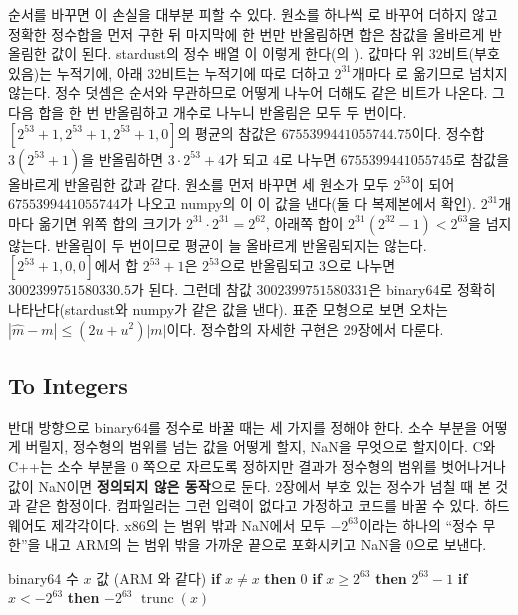 순서를 바꾸면 이 손실을 대부분 피할 수 있다. 원소를 하나씩 로 바꾸어 더하지 않고 정확한 정수합을 먼저 구한 뒤 마지막에 한 번만 반올림하면 합은 참값을 올바르게 반올림한 값이 된다. stardust의 정수 배열 이 이렇게 한다(의 ). 값마다 위 $32$비트(부호 있음)는  누적기에, 아래 $32$비트는  누적기에 따로 더하고 $2^{31}$개마다 로 옮기므로 넘치지 않는다. 정수 덧셈은 순서와 무관하므로 어떻게 나누어 더해도 같은 비트가 나온다. 그다음 합을 한 번 반올림하고 개수로 나누니 반올림은 모두 두 번이다. $[2^{53}+1,2^{53}+1,2^{53}+1,0]$의 평균의 참값은 $6755399441055744.75$이다. 정수합 $3(2^{53}+1)$을 반올림하면 $3\cdot2^{53}+4$가 되고 $4$로 나누면 $6755399441055745$로 참값을 올바르게 반올림한 값과 같다. 원소를 먼저 바꾸면 세 원소가 모두 $2^{53}$이 되어 $6755399441055744$가 나오고 numpy의 이 이 값을 낸다(둘 다 복제본에서 확인). $2^{31}$개마다 옮기면 위쪽 합의 크기가 $2^{31}\cdot2^{31}=2^{62}$, 아래쪽 합이 $2^{31}(2^{32}-1)<2^{63}$을 넘지 않는다. 반올림이 두 번이므로 평균이 늘 올바르게 반올림되지는 않는다. $[2^{53}+1,0,0]$에서 합 $2^{53}+1$은 $2^{53}$으로 반올림되고 $3$으로 나누면 $3002399751580330.5$가 된다. 그런데 참값 $3002399751580331$은 binary64로 정확히 나타난다(stardust와 numpy가 같은 값을 낸다). 표준 모형으로 보면 오차는 $|\hat m-m|\le(2u+u^2)|m|$이다. 정수합의 자세한 구현은 29장에서 다룬다.

\subsection{To Integers}

반대 방향으로 binary64를 정수로 바꿀 때는 세 가지를 정해야 한다. 소수 부분을 어떻게 버릴지, 정수형의 범위를 넘는 값을 어떻게 할지, NaN을 무엇으로 할지이다. C와 C++는 소수 부분을 $0$ 쪽으로 자르도록 정하지만 결과가 정수형의 범위를 벗어나거나 값이 NaN이면 \textbf{정의되지 않은 동작}으로 둔다\cite{iso14882-2020}. 2장에서 부호 있는 정수가 넘칠 때 본 것과 같은 함정이다. 컴파일러는 그런 입력이 없다고 가정하고 코드를 바꿀 수 있다. 하드웨어도 제각각이다. x86의 는 범위 밖과 NaN에서 모두 $-2^{63}$이라는 하나의 ``정수 무한''을 내고 ARM의 는 범위 밖을 가까운 끝으로 포화시키고 NaN을 $0$으로 보낸다.

\begin{algorithm}[htbp]
\begin{algorithmic}[1]
\Require binary64 수 $x$
\Ensure {} 값 (ARM 와 같다)
\State \textbf{if} $x\ne x$ \textbf{then} \Return $0$
\State \textbf{if} $x\ge2^{63}$ \textbf{then} \Return $2^{63}-1$ 
\State \textbf{if} $x<-2^{63}$ \textbf{then} \Return $-2^{63}$ 
\State \Return $\operatorname{trunc}(x)$ 
\end{algorithmic}
\caption{포화하는  $\to$  변환 (stardust , )}
\label{alg:float-to-int}
\end{algorithm}

